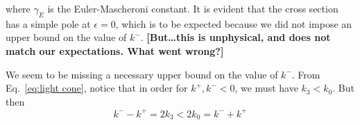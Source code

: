 \documentclass[11pt,twoside,reqno]{amsart}
\theoremstyle{plain}
\theoremstyle{remark}
\theoremstyle{definition}
\theoremstyle{remark}
\theoremstyle{definition}
\theoremstyle{definition}
\begin{document}
where $\gamma_E$ is the Euler-Mascheroni constant. It is evident that the cross section has a simple pole at $\epsilon = 0$, which is to be expected because we did not impose an upper bound on the value of $k^-$. {\color{red}\textbf{[But\dots this is unphysical, and does not match our expectations. What went wrong?]}}

We seem to be missing a necessary upper bound on the value of $k^-$. From Eq.\ \ref{eq:light cone}, notice that in order for $k^+, k^- < 0$, we must have $k_3 < k_0$. But then
\begin{equation}
	k^- - k^+ = 2k_3 < 2k_0 = k^- + k^+
\end{equation}




\end{document}
